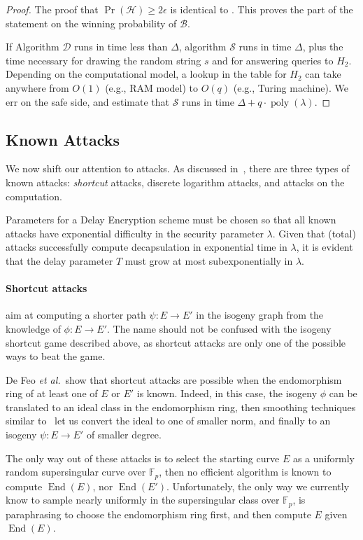 \documentclass{llncs}
\newcommand{\F}{\mathbb{F}}
\DeclareMathOperator{\End}{End}
\DeclareMathOperator{\poly}{poly}
\begin{document}
\begin{proof}
  The proof that $\Pr(\mathcal{H})\ge 2\epsilon$ is identical to
  \cite[Lemma~4.3, Claim~2]{doi:10.1137/S0097539701398521}. %
  This proves the part of the statement on the winning probability of
  $\mathcal{B}$.
  
  If Algorithm $\mathcal{D}$ runs in time less than $\Delta$,
  algorithm $\mathcal{S}$ runs in time $\Delta$, plus the time
  necessary for drawing the random string $s$ and for answering
  queries to $H_2$. %
  Depending on the computational model, a lookup in the table for
  $H_2$ can take anywhere from $O(1)$ (e.g., RAM model) to $O(q)$
  (e.g., Turing machine). %
  We err on the safe side, and estimate that $\mathcal{S}$ runs in
  time $\Delta + q\cdot\poly(\lambda)$.
\end{proof}


\subsection{Known Attacks}
We now shift our attention to attacks. %
As discussed in~\cite{10.1007/978-3-030-34578-5_10}, there are three
types of known attacks: \emph{shortcut} attacks, discrete logarithm
attacks, and attacks on the computation.

Parameters for a Delay Encryption scheme must be chosen so that all
known attacks have exponential difficulty in the security parameter
$\lambda$. %
Given that (total) attacks successfully compute decapsulation in
exponential time in $\lambda$, it is evident that the delay parameter
$T$ must grow at most subexponentially in $\lambda$.

\paragraph{Shortcut attacks} aim at computing a shorter path
$\psi:E\to E'$ in the isogeny graph from the knowledge of
$\phi:E\to E'$. %
The name should not be confused with the isogeny shortcut game
described above, as shortcut attacks are only one of the possible ways
to beat the game.

De Feo \emph{et al.}\ show that shortcut attacks are possible when the
endomorphism ring of at least one of $E$ or $E'$ is known. %
Indeed, in this case, the isogeny $\phi$ can be translated to an ideal
class in the endomorphism ring, then smoothing techniques similar
to~\cite{kohel2014quaternion} let us convert the ideal to one of
smaller norm, and finally to an isogeny $\psi:E\to E'$ of smaller
degree.

The only way out of these attacks is to select the starting curve $E$
as a uniformly random supersingular curve over $\F_p$, then no
efficient algorithm is known to compute $\End(E)$, nor $\End(E')$. %
Unfortunately, the only way we currently know to sample nearly
uniformly in the supersingular class over $\F_p$, is
paraphrasing \cite{10.1007/978-3-030-34578-5_10} to choose the
endomorphism ring first, and then compute $E$ given $\End(E)$.
\end{document}
